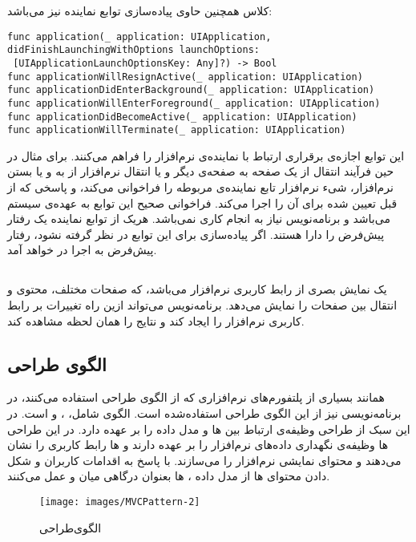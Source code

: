 \documentclass[oneside]{report}
\begin{document}
کلاس
			{\normalsize {}}	
	همچنین حاوی پیاده‌سازی توابع نماینده نیز می‌باشد:
\begin{latin}
	\begin{verbatim}
func application(_ application: UIApplication, 
didFinishLaunchingWithOptions launchOptions:
 [UIApplicationLaunchOptionsKey: Any]?) -> Bool
func applicationWillResignActive(_ application: UIApplication)
func applicationDidEnterBackground(_ application: UIApplication)
func applicationWillEnterForeground(_ application: UIApplication)
func applicationDidBecomeActive(_ application: UIApplication)
func applicationWillTerminate(_ application: UIApplication)
	\end{verbatim}
	
\end{latin}	
این توابع اجازه‌ی برقراری ارتباط با نماینده‌ی نرم‌افزار را فراهم می‌کنند. برای مثال در حین فرآیند انتقال از یک صفحه به صفحه‌ی دیگر و یا انتقال نرم‌افزار از 
			{\normalsize {}}	
			به 
						{\normalsize {}}
و یا بستن نرم‌افزار، شیء نرم‌افزار تابع نماینده‌ی مربوطه را فراخوانی می‌‌کند، و پاسخی که از قبل تعیین شده برای آن را اجرا می‌کند.	فراخوانی صحیح این توابع به عهده‌ی سیستم می‌باشد و برنامه‌نویس نیاز به انجام کاری نمی‌باشد. 					
هریک از توابع نماینده یک رفتار پیش‌فرض را دارا هستند. اگر پیاده‌سازی برای این توابع در نظر گرفته نشود، رفتار پیش‌فرض به اجرا در خواهد آمد. 
\subsection{	{\small {}}}
{\normalsize {}}
یک نمایش بصری از رابط کاربری نرم‌افزار می‌باشد، که صفحات مختلف، محتوی و انتقال بین صفحات را نمایش می‌دهد. 
برنامه‌نویس می‌تواند ازین راه تغییرات بر رابط کاربری نرم‌افزار را ایجاد کند و نتایج را همان لحظه مشاهده کند.  	
\subsection{الگوی طراحی {\small {}}}
همانند بسیاری از پلتفورم‌های نرم‌افزاری که از الگوی طراحی
{\normalsize {}}
استفاده می‌کنند، در برنامه‌نویسی 
{\normalsize {}}
نیز از این الگوی طراحی استفاده‌‌شده است. الگوی 
{\normalsize {}}
شامل، 
{\normalsize {}}
،
{\normalsize {}} و
{\normalsize {}}
است.  در این سبک از طراحی 
{\normalsize {}} 
وظیفه‌ی ارتباط بین 
{\normalsize {}} ها 
و مدل داده
را بر عهده دارد. در این طراحی 
{\normalsize {}} ها 
وظیفه‌ی نگهداری داده‌های نرم‌افزار را بر عهده دارند و 
{\normalsize {}} ها 
  رابط کاربری را نشان می‌دهند و محتوای نمایشی نرم‌افزار را می‌سازند. با پاسخ به اقدامات کاربران و شکل دادن محتوای 
  {\normalsize {}} 
  ها از مدل داده ، 
  {\normalsize {}} 
  ها بعنوان درگاهی میان 
  {\normalsize {}} 
  و 
  {\normalsize {}} 
  عمل می‌کنند.
  \begin{figure}[h]
  	\centering
  	\texttt{[image: images/MVCPattern-2]}
  	\caption{الگوی‌طراحی  {\normalsize {}} }
  	\label{fig:mvcpattern-2}
  \end{figure}
\end{document}
